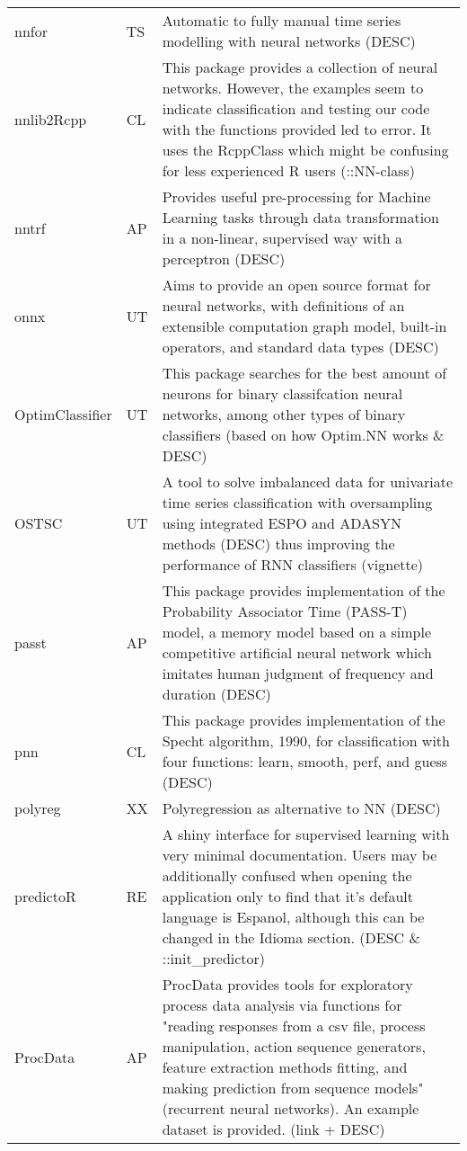 \begin{Schunk}
\begin{longtable}[t]{ll>{\raggedright\arraybackslash}p{10cm}}
nnfor & TS & Automatic to fully manual time series modelling with neural networks (DESC)\\
nnlib2Rcpp & CL & This package provides a collection of neural networks. However, the examples seem to indicate classification and testing our code with the functions provided led to error. It uses the RcppClass which might be confusing for less experienced R users (::NN-class)\\
nntrf & AP & Provides useful pre-processing for Machine Learning tasks through data transformation in a non-linear, supervised way with a perceptron (DESC)\\
onnx & UT & Aims to provide an open source format for neural networks, with definitions of an extensible computation graph model, built-in operators, and standard data types (DESC)\\
\addlinespace
OptimClassifier & UT & This package searches for the best amount of neurons for binary classifcation neural networks, among other types of binary classifiers (based on how Optim.NN works \& DESC)\\
OSTSC & UT & A tool to solve imbalanced data for univariate time series classification with oversampling using integrated ESPO and ADASYN methods (DESC) thus improving the performance of RNN classifiers (vignette)\\
passt & AP & This package provides implementation of the Probability Associator Time (PASS-T) model, a memory model based on a simple competitive artificial neural network which imitates human judgment of frequency and duration (DESC)\\
pnn & CL & This package provides implementation of the Specht algorithm, 1990, for classification with four functions: learn, smooth, perf, and guess (DESC)\\
polyreg & XX & Polyregression as alternative to NN (DESC)\\
\addlinespace
predictoR & RE & A shiny interface for supervised learning with very minimal documentation. Users may be additionally confused when opening the application only to find that it's default language is Espanol, although this can be changed in the Idioma section. (DESC \& ::init\_predictor)\\
ProcData & AP & ProcData provides tools for exploratory process data analysis via functions for "reading responses from a csv file, process manipulation, action sequence generators, feature extraction methods fitting, and making prediction from sequence models" (recurrent neural networks). An example dataset is provided. (link + DESC)\\

\end{longtable}
\end{Schunk}

